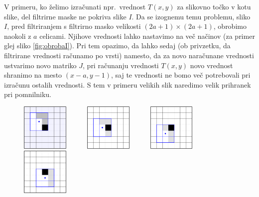 V primeru, ko želimo izračunati npr.\ vrednost $T(x, y)$ za slikovno točko v kotu slike, del filtrirne maske ne pokriva slike $I$. Da se izognemu temu problemu, sliko $I$, pred filtriranjem s filtrirno masko velikosti $(2a + 1) \times (2a + 1)$, obrobimo naokoli z $a$ celicami. Njihove vrednosti lahko nastavimo na več načinov (za primer glej sliko \ref{fig:obrobaI}). Pri tem opazimo, da lahko sedaj (ob privzetku, da filtrirane vrednosti računamo po vrsti) namesto, da za novo naračunane vrednosti ustvarimo novo matriko $J$, pri računanju vrednosti $T(x, y)$ novo vrednost shranimo na mesto $(x-a, y-1)$, saj te vrednosti ne bomo več potrebovali pri izračunu ostalih vrednosti. S tem v primeru velikih slik naredimo velik prihranek pri pomnilniku.
%
\begin{primer}

\begin{figure}[htbp]
  \centering
  \includegraphics[width=0.2\textwidth]{./slike-latex/filter1}\ \ \ \ \ \ 
  \includegraphics[width=0.2\textwidth]{./slike-latex/filter2}\ \ \ \ \ \ 
  \includegraphics[width=0.2\textwidth]{./slike-latex/filter3}\ \ \ \ \ \ 
  \includegraphics[width=0.2\textwidth]{./slike-latex/filter4}\\[0.6cm]


\end{figure}
\end{primer}
